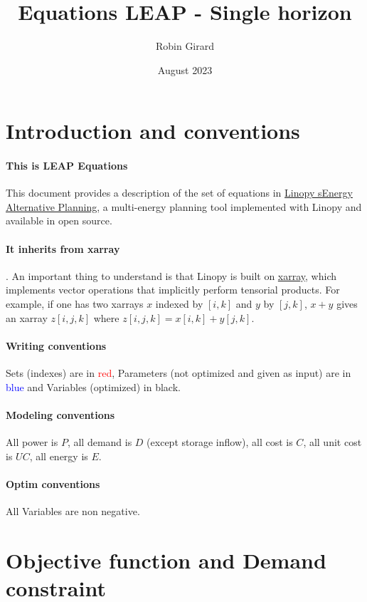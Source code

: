 \documentclass{article}
\title{Equations LEAP - Single horizon}
\author{Robin Girard }
\date{August 2023}
\begin{document}
\maketitle
\tableofcontents
\footnotesize
\section{Introduction and conventions}
\paragraph{This is LEAP Equations} This document provides a description of the set of equations in \href{https://github.com/robingirard/Energy-Alternatives-Planning/blob/master/Models/Linopy/f_planningModels_linopy.py}{Linopy sEnergy Alternative Planning}, a multi-energy planning tool implemented with Linopy and available in open source. 
\\

\paragraph{It inherits from xarray}. An important thing to understand is that Linopy is built on \href{https://docs.xarray.dev/en/stable/}{xarray}, which implements vector operations that implicitly perform tensorial products. For example, if one has two xarrays $x$ indexed by $[i,k]$ and $y$ by $[j, k]$, $x + y$ gives an xarray $z[i,j,k]$ where $z[i,j,k] = x[i,k]+ y[j,k]$.


\paragraph{Writing conventions}
Sets (indexes) are in \textcolor{red}{red}, Parameters (not optimized and given as input) are in \textcolor{blue}{blue} and Variables (optimized) in black.

\paragraph{Modeling conventions}
All power is $P$, all demand is $D$ (except storage inflow), all cost is $C$, all unit cost is $UC$, all energy is $E$. 

\paragraph{Optim conventions}
All Variables are non negative. 


\newpage
\section{Objective function and Demand constraint}
\end{document}
